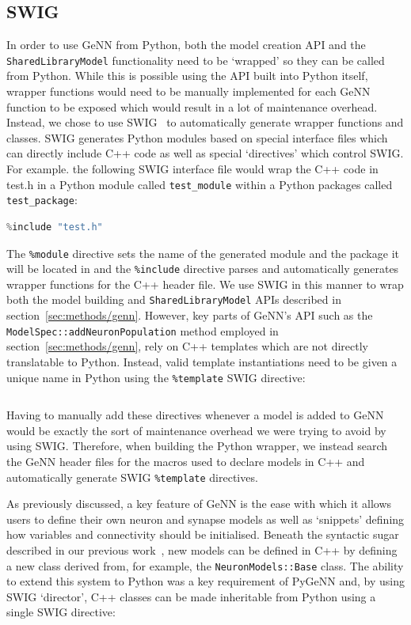 \documentclass[utf8]{frontiersSCNS} %
\begin{document}
\subsection{SWIG}
In order to use GeNN from Python, both the model creation API and the \lstinline{SharedLibraryModel} functionality need to be `wrapped' so they can be called from Python.
While this is possible using the API built into Python itself, wrapper functions would need to be manually implemented for each GeNN function to be exposed which would result in a lot of maintenance overhead.
Instead, we chose to use SWIG~\citep{Beazley1996} to automatically generate wrapper functions and classes. 
SWIG generates Python modules based on special interface files which can directly include C++ code as well as special `directives' which control SWIG.
For example. the following SWIG interface file would wrap the C++ code in test.h in a Python module called \lstinline{test_module} within a Python packages called \lstinline{test_package}:
%
\begin{lstlisting}[language=C++]
%module(package="test_package") test_module
%include "test.h" 
\end{lstlisting}
%
The \lstinline{%module} directive sets the name of the generated module and the package it will be located in and the \lstinline{%include} directive parses and automatically generates wrapper functions for the C++ header file.
We use SWIG in this manner to wrap both the model building and \lstinline{SharedLibraryModel} APIs described in section~\ref{sec:methods/genn}.
However, key parts of GeNN's API such as the \lstinline{ModelSpec::addNeuronPopulation} method employed in section~\ref{sec:methods/genn}, rely on C++ templates which are not directly translatable to Python.
Instead, valid template instantiations need to be given a unique name in Python using the \lstinline{%template} SWIG directive:
%
\begin{lstlisting}[language=C++]
%template(addNeuronPopulationLIF) ModelSpec::addNeuronPopulation<NeuronModels::LIF>;
\end{lstlisting}
%
Having to manually add these directives whenever a model is added to GeNN would be exactly the sort of maintenance overhead we were trying to avoid by using SWIG.
Therefore, when building the Python wrapper, we instead search the GeNN header files for the macros used to declare models in C++ and automatically generate SWIG \lstinline{%template} directives.

As previously discussed, a key feature of GeNN is the ease with which it allows users to define their own neuron and synapse models as well as `snippets' defining how variables and connectivity should be initialised.
Beneath the syntactic sugar described in our previous work~\citep{Knight2018}, new models can be defined in C++ by defining a new class derived from, for example, the \lstinline{NeuronModels::Base} class.
The ability to extend this system to Python was a key requirement of PyGeNN and, by using SWIG `director', C++ classes can be made inheritable from Python using a single SWIG directive:
%
\begin{lstlisting}[language=C++]
%feature("director") NeuronModels::Base; 
\end{lstlisting}
\end{document}

